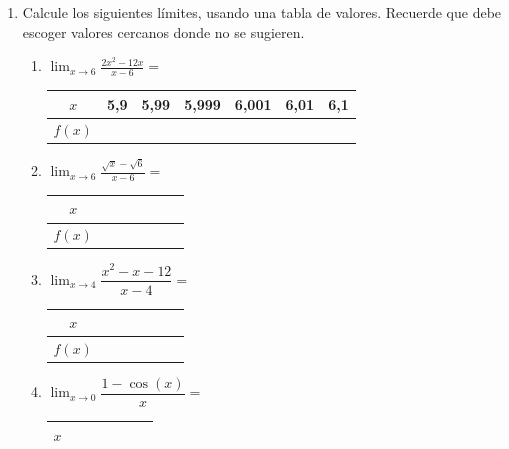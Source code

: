 \documentclass[fleqn,10pt]{article}
\let\ds\displaystyle
\begin{document}
\ExamNameLine
\begin{enumerate}
   \item Calcule los siguientes límites, usando una tabla de valores. Recuerde que debe escoger valores cercanos donde no se sugieren.
      \begin{enumerate}
	 \item $\ds{\lim_{x\rightarrow6}\frac{2x^{2}-12x}{x-6}}=$
\begin{center}
   \begin{tabular}{|c|p{1.2cm}|p{1.2cm}|p{1.2cm}||p{1.2cm}|p{1.2cm}|p{1.2cm}|}
\hline 
$x$ & 5,9 & 5,99 & 5,999 & 6,001 & 6,01 & 6,1  \\ 
\hline 
$f(x)$ &  &  &  &  & & \\ 
\hline 
\end{tabular} 
\end{center}	 
	 \item $\ds{\lim_{x\rightarrow6}\frac{\sqrt{x}-\sqrt{6}}{x-6}}=$
\begin{center}
   \begin{tabular}{|c|p{1.2cm}|p{1.2cm}|p{1.2cm}||p{1.2cm}|p{1.2cm}|p{1.2cm}|}
\hline 
$x$ &  &  &  &  &  &  \\ 
\hline 
$f(x)$ &  &  &  &  & & \\ 
\hline 
\end{tabular} 
\end{center}	
\item $\ds{\lim_{x\rightarrow 4}\dfrac{x^2-x-12}{x-4}}=$	 
\begin{center}
   \begin{tabular}{|c|p{1.2cm}|p{1.2cm}|p{1.2cm}||p{1.2cm}|p{1.2cm}|p{1.2cm}|}
\hline 
$x$ &  &  &  &  &  &  \\ 
\hline 
$f(x)$ &  &  &  &  & & \\ 
\hline 
\end{tabular} 
\end{center}	
\item $\ds{\lim_{x\rightarrow 0}\dfrac{1-\cos(x)}{x}}=$
\begin{center}
   \begin{tabular}{|c|p{1.2cm}|p{1.2cm}|p{1.2cm}||p{1.2cm}|p{1.2cm}|p{1.2cm}|}
\hline 
$x$ &  &  &  &  &  &  \\ 
\hline 

\end{tabular}
\end{center}
\end{enumerate}
\end{enumerate}
\end{document}
